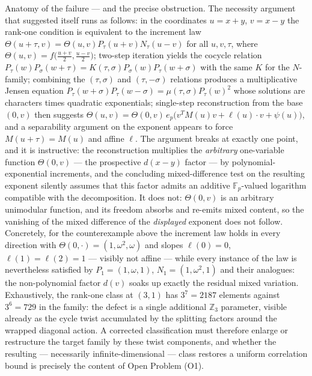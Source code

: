 \documentclass[11pt]{article}
\theoremstyle{remark}
\begin{document}
Anatomy of the failure — and the precise obstruction. The necessity argument
that suggested itself runs as follows: in the coordinates $u=x+y$, $v=x-y$
the rank-one condition is equivalent to the increment law
$\Theta(u+\tau,v)=\Theta(u,v)P_\tau(u+v)N_\tau(u-v)$ for all $u,v,\tau$,
where $\Theta(u,v)=f\bigl(\tfrac{u+v}{2},\tfrac{u-v}{2}\bigr)$; two-step
iteration yields the cocycle relation
$P_\tau(w)P_\sigma(w+\tau)=K(\tau,\sigma)P_\sigma(w)P_\tau(w+\sigma)$ with
the same $K$ for the $N$-family; combining the $(\tau,\sigma)$ and
$(\tau,-\sigma)$ relations produces a multiplicative Jensen equation
$P_\tau(w+\sigma)P_\tau(w-\sigma)=\mu(\tau,\sigma)P_\tau(w)^2$ whose
solutions are characters times quadratic exponentials; single-step
reconstruction from the base $(0,v)$ then suggests
$\Theta(u,v)=\Theta(0,v)\,e_p\bigl(v^{T}M(u)v+\ell(u)\cdot v+\psi(u)\bigr)$,
and a separability argument on the exponent appears to force
$M(u+\tau)=M(u)$ and affine $\ell$. The argument breaks at exactly one
point, and it is instructive: the reconstruction multiplies the
\emph{arbitrary} one-variable function $\Theta(0,v)$ — the prospective
$d(x-y)$ factor — by polynomial-exponential increments, and the concluding
mixed-difference test on the resulting exponent silently assumes that this
factor admits an additive $\mathbb{F}_p$-valued logarithm compatible with
the decomposition. It does not: $\Theta(0,v)$ is an arbitrary unimodular
function, and its freedom absorbs and re-emits mixed content, so the
vanishing of the mixed difference of the \emph{displayed} exponent does not
follow. Concretely, for the counterexample above the increment law
holds in every direction with
$\Theta(0,\cdot)=(1,\omega^{2},\omega)$ and slopes
$\ell(0)=0$, $\ell(1)=\ell(2)=1$ — visibly not affine — while every
instance of the law is nevertheless satisfied by
$P_1=(1,\omega,1)$, $N_1=(1,\omega^{2},1)$ and their analogues: the
non-polynomial factor $d(v)$ soaks up exactly the residual mixed variation.
Exhaustively, the rank-one class at $(3,1)$ has $3^{7}=2187$ elements
against $3^{6}=729$ in the family: the defect is a single additional
$\mathbb{Z}_3$ parameter, visible already as the cycle twist accumulated by
the splitting factors around the wrapped diagonal action. A corrected
classification must therefore enlarge or restructure the target family by
these twist components, and whether the resulting — necessarily
infinite-dimensional — class restores a uniform correlation bound is
precisely the content of Open Problem (O1).
\end{document}
